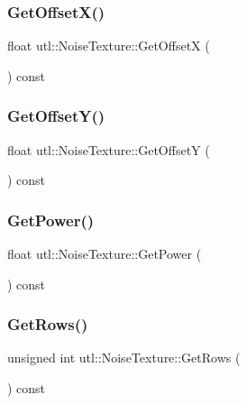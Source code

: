 \subsubsection{\texorpdfstring{Get\+Offset\+X()}{GetOffsetX()}}
{\footnotesize\ttfamily float utl\+::\+Noise\+Texture\+::\+Get\+OffsetX (\begin{DoxyParamCaption}{ }\end{DoxyParamCaption}) const}

\mbox{\label{classutl_1_1_noise_texture_aefd7f378393cdce66f3db6ef54ffd47c}} 
\subsubsection{\texorpdfstring{Get\+Offset\+Y()}{GetOffsetY()}}
{\footnotesize\ttfamily float utl\+::\+Noise\+Texture\+::\+Get\+OffsetY (\begin{DoxyParamCaption}{ }\end{DoxyParamCaption}) const}

\mbox{\label{classutl_1_1_noise_texture_acabbfbad778b09a0cd1989b290005510}} 
\subsubsection{\texorpdfstring{Get\+Power()}{GetPower()}}
{\footnotesize\ttfamily float utl\+::\+Noise\+Texture\+::\+Get\+Power (\begin{DoxyParamCaption}{ }\end{DoxyParamCaption}) const}

\mbox{\label{classutl_1_1_noise_texture_ac45cbc36392efc7ee910e4bc24fdcd3e}} 
\subsubsection{\texorpdfstring{Get\+Rows()}{GetRows()}}
{\footnotesize\ttfamily unsigned int utl\+::\+Noise\+Texture\+::\+Get\+Rows (\begin{DoxyParamCaption}{ }\end{DoxyParamCaption}) const}

